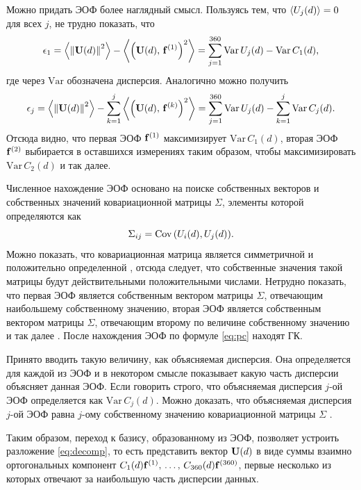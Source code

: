 Можно придать ЭОФ более наглядный смысл. Пользуясь тем, что $\expval{U_j(d)}=0$ для всех $j$, не трудно показать, что
\begin{equation}
    \epsilon_1 = \expval{\norm{\vb{U}(d)}^2} - \expval{\qty(\vb{U}(d),\, \vb{f}^{(1)})^2} = \sum\limits_{j=1}^{360} \mathrm{Var}\, U_j(d) - \mathrm{Var}\, C_1(d),
\end{equation}
где через $\mathrm{Var}$ обозначена дисперсия. Аналогично можно получить
\begin{equation}
    \epsilon_j = \expval{\norm{\vb{U}(d)}^2} - \sum\limits_{k=1}^{j} \expval{\qty(\vb{U}(d),\, \vb{f}^{(k)})^2} = \sum\limits_{j=1}^{360} \mathrm{Var}\, U_j(d) - \sum\limits_{k=1}^{j}\mathrm{Var}\, C_j(d).
\end{equation}
Отсюда видно, что первая ЭОФ $\vb{f}^{(1)}$ максимизирует $\mathrm{Var}\, C_1(d)$, вторая ЭОФ $\vb{f}^{(2)}$ выбирается в оставшихся измерениях таким образом, чтобы максимизировать $\mathrm{Var}\, C_2(d)$ и так далее.

Численное нахождение ЭОФ основано на поиске собственных векторов и собственных значений ковариационной матрицы $\Sigma$, элементы которой определяются как
\begin{equation}
    \Sigma_{ij} = \mathrm{Cov}\, \qty(U_i(d), U_j(d)).
\end{equation}
Можно показать, что ковариационная матрица является симметричной и положительно определенной \cite[Утв. 6.1]{Zhang_Moore_2015}, отсюда следует, что собственные значения такой матрицы будут действительными положительными числами. Нетрудно показать, что первая ЭОФ является собственным вектором матрицы $\Sigma$, отвечающим наибольшему собственному значению, вторая ЭОФ является собственным вектором матрицы $\Sigma$, отвечающим второму по величине собственному значению и так далее \cite[Tеор. 6.1 и 6.3]{Zhang_Moore_2015}. После нахождения ЭОФ по формуле \eqref{eq:pc} находят ГК.

Принято вводить такую величину, как объясняемая дисперсия. Она определяется для каждой из ЭОФ и в некотором смысле показывает какую часть дисперсии объясняет данная ЭОФ. Если говорить строго, что объясняемая дисперсия $j$-ой ЭОФ определяется как $\mathrm{Var}\, C_j(d)$. Можно доказать, что объясняемая дисперсия $j$-ой ЭОФ равна $j$-ому собственному значению ковариационной матрицы $\Sigma$ \cite[Утв. 6.2]{Zhang_Moore_2015}.

Таким образом, переход к базису, образованному из ЭОФ, позволяет устроить разложение \eqref{eq:decomp}, то есть представить вектор $\vb{U}(d)$ в виде суммы взаимно ортогональных компонент $C_1(d)\vb{f}^{(1)},\, \ldots,\, C_{360}(d) \vb{f}^{(360)}$, первые несколько из которых отвечают за наибольшую часть дисперсии данных.

